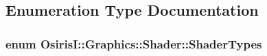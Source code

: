 \subsection{Enumeration Type Documentation}
\hypertarget{namespace_osiris_i_1_1_graphics_1_1_shader_a337cc6333eff5c701288da2fb4fd9cec}{
\subsubsection[{Shader\-Types}]{\setlength{\rightskip}{0pt plus 5cm}enum {\bf Osiris\-I\-::\-Graphics\-::\-Shader\-::\-Shader\-Types}}}\label{namespace_osiris_i_1_1_graphics_1_1_shader_a337cc6333eff5c701288da2fb4fd9cec}
